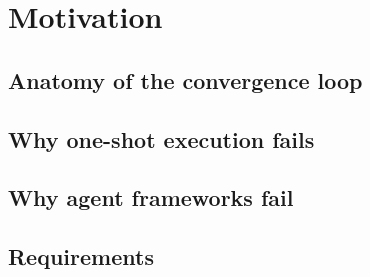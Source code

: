 \section{Motivation}
\label{sec:motivation}


\subsection{Anatomy of the convergence loop}

\subsection{Why one-shot execution fails}

\subsection{Why agent frameworks fail}

\subsection{Requirements}
